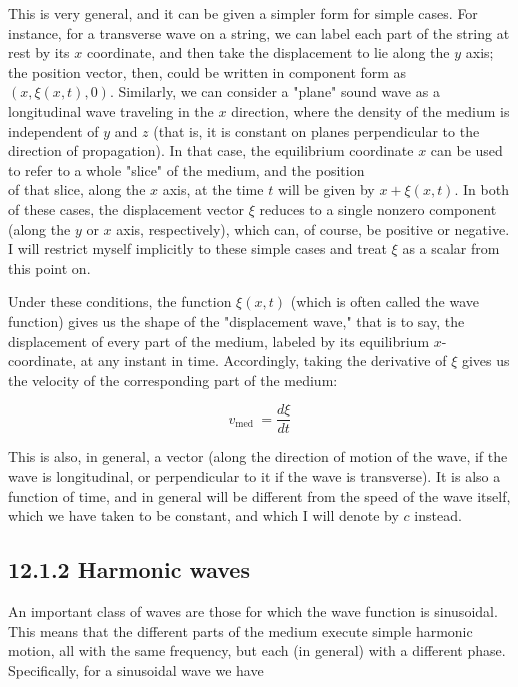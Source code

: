 \documentclass[10pt]{article}
\begin{document}
This is very general, and it can be given a simpler form for simple cases. For instance, for a transverse wave on a string, we can label each part of the string at rest by its $x$ coordinate, and then take the displacement to lie along the $y$ axis; the position vector, then, could be written in component form as $(x, \xi(x, t), 0)$. Similarly, we can consider a "plane" sound wave as a longitudinal wave traveling in the $x$ direction, where the density of the medium is independent of $y$ and $z$ (that is, it is constant on planes perpendicular to the direction of propagation). In that case, the equilibrium coordinate $x$ can be used to refer to a whole "slice" of the medium, and the position\\
of that slice, along the $x$ axis, at the time $t$ will be given by $x+\xi(x, t)$. In both of these cases, the displacement vector $\xi$ reduces to a single nonzero component (along the $y$ or $x$ axis, respectively), which can, of course, be positive or negative. I will restrict myself implicitly to these simple cases and treat $\xi$ as a scalar from this point on.

Under these conditions, the function $\xi(x, t)$ (which is often called the wave function) gives us the shape of the "displacement wave," that is to say, the displacement of every part of the medium, labeled by its equilibrium $x$-coordinate, at any instant in time. Accordingly, taking the derivative of $\xi$ gives us the velocity of the corresponding part of the medium:


\begin{equation*}
v_{\text {med }}=\frac{d \xi}{d t} \tag{12.2}
\end{equation*}


This is also, in general, a vector (along the direction of motion of the wave, if the wave is longitudinal, or perpendicular to it if the wave is transverse). It is also a function of time, and in general will be different from the speed of the wave itself, which we have taken to be constant, and which I will denote by $c$ instead.

\subsection*{12.1.2 Harmonic waves}
An important class of waves are those for which the wave function is sinusoidal. This means that the different parts of the medium execute simple harmonic motion, all with the same frequency, but each (in general) with a different phase. Specifically, for a sinusoidal wave we have
\end{document}
